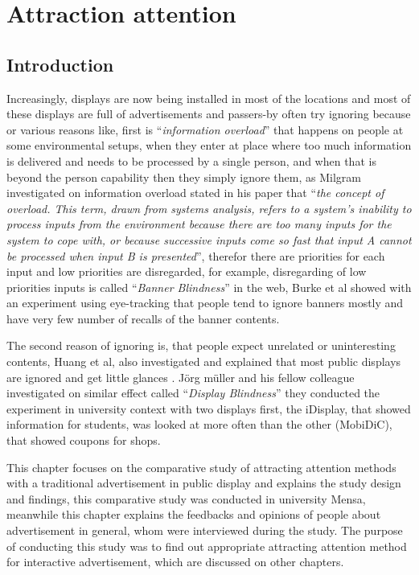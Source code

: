 
\chapter{Attraction attention} %

\label{Chapter3} %
\newpage

\section{Introduction}

Increasingly, displays are now being installed in most of the locations and most of these displays are full of advertisements and passers-by often try ignoring because or various reasons like, first is ``\emph{information overload}'' that happens on people at some environmental setups, when they enter at place where too much information is delivered and needs to be processed by a single person, and when that is beyond the person capability then they simply ignore them, as Milgram \cite{Information_overload} investigated on information overload stated in his paper that ``\emph{the concept of overload. This term, drawn from systems analysis, refers to a system's inability to process inputs from the environment because there are too many inputs for the system to cope with, or because successive inputs come so fast that input A cannot be processed when input B is presented}'', therefor there are priorities for each input and low priorities are disregarded, for example, disregarding of low priorities inputs is called ``\emph{Banner Blindness}'' in the web, Burke et al \cite{banner_blindness} showed with an experiment using eye-tracking that people tend to ignore banners mostly and have very few number of recalls of the banner contents.

The second reason of ignoring is, that people expect unrelated or uninteresting contents, Huang et al, also investigated and explained that most public displays are ignored and get little glances \cite{When_display}. Jörg müller and his fellow colleague \cite{display_blindness} investigated on similar effect called ``\emph{Display Blindness}'' they conducted the experiment in university context with two displays first, the iDisplay, that showed information for students, was looked at more often than the other (MobiDiC), that showed coupons for shops.

This chapter focuses on the comparative study of attracting attention methods with a traditional advertisement in public display and explains the study design and findings, this comparative study was conducted in university Mensa, meanwhile this chapter explains the feedbacks and opinions of people about advertisement in general, whom were interviewed during the study. The purpose of conducting this study was to find out appropriate attracting attention method for interactive advertisement, which are discussed on other chapters.



